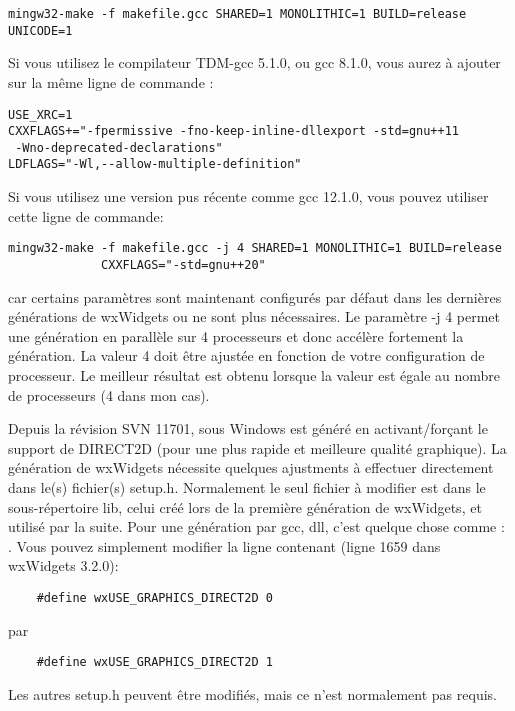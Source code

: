 \begin{verbatim}
mingw32-make -f makefile.gcc SHARED=1 MONOLITHIC=1 BUILD=release UNICODE=1
\end{verbatim}

Si vous utilisez le compilateur TDM-gcc 5.1.0, ou gcc 8.1.0, vous aurez à ajouter sur la même ligne de commande : 
\begin{verbatim}
USE_XRC=1
CXXFLAGS+="-fpermissive -fno-keep-inline-dllexport -std=gnu++11
 -Wno-deprecated-declarations"
LDFLAGS="-Wl,--allow-multiple-definition"
\end{verbatim}  

Si vous utilisez une version pus récente comme gcc 12.1.0, vous pouvez utiliser cette ligne de commande:
\begin{verbatim}
mingw32-make -f makefile.gcc -j 4 SHARED=1 MONOLITHIC=1 BUILD=release
             CXXFLAGS="-std=gnu++20"
\end{verbatim}
car certains paramètres sont maintenant configurés par défaut dans les dernières générations de wxWidgets ou ne sont plus nécessaires.\newline
Le paramètre -j 4 permet une génération en parallèle sur 4 processeurs et donc accélère fortement la génération. La valeur 4 doit être ajustée en fonction de votre configuration de processeur.
Le meilleur résultat est obtenu lorsque la valeur est égale au nombre de processeurs (4 dans mon cas).

Depuis la révision SVN 11701, \codeblocks sous Windows est généré en activant/forçant le support de DIRECT2D (pour une plus rapide et meilleure qualité graphique). La génération de wxWidgets nécessite quelques ajustments à effectuer directement dans le(s) fichier(s) setup.h. Normalement le seul fichier à modifier est dans le sous-répertoire lib, celui créé lors de la première génération de wxWidgets, et utilisé par la suite. Pour une génération par gcc, dll, c'est quelque chose comme : .\newline
Vous pouvez simplement modifier la ligne contenant (ligne 1659 dans wxWidgets 3.2.0):
\begin{verbatim}
    #define wxUSE_GRAPHICS_DIRECT2D 0 
\end{verbatim}
par
\begin{verbatim}
    #define wxUSE_GRAPHICS_DIRECT2D 1  
\end{verbatim}
Les autres setup.h peuvent être modifiés, mais ce n'est normalement pas requis.

